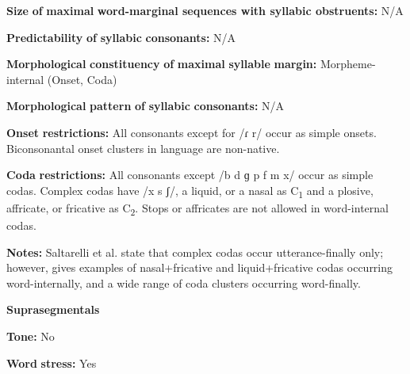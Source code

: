 \begin{styleBody}
\textbf{Size} \textbf{of} \textbf{maximal} \textbf{word{}-marginal sequences with syllabic obstruents:} N/A
\end{styleBody}

\begin{styleBody}
\textbf{Predictability} \textbf{of} \textbf{syllabic} \textbf{consonants:} N/A
\end{styleBody}

\begin{styleBody}
\textbf{Morphological} \textbf{constituency} \textbf{of} \textbf{maximal} \textbf{syllable} \textbf{margin:} Morpheme-internal (Onset, Coda)
\end{styleBody}

\begin{styleBody}
\textbf{Morphological} \textbf{pattern} \textbf{of} \textbf{syllabic} \textbf{consonants:} N/A
\end{styleBody}

\begin{styleBody}
\textbf{Onset} \textbf{restrictions:} All consonants except for /ɾ r/ occur as simple onsets. Biconsonantal onset clusters in language are non-native.
\end{styleBody}

\begin{styleBody}
\textbf{Coda} \textbf{restrictions:} All consonants except /b d ɡ p f m x/ occur as simple codas. Complex codas have /x s ʃ/, a liquid, or a nasal as C\textsubscript{1} and a plosive, affricate, or fricative as C\textsubscript{2}. Stops or affricates are not allowed in word-internal codas.
\end{styleBody}

\begin{styleBody}
\textbf{Notes:} Saltarelli et al. state that complex codas occur utterance-finally only; however, \citet{Hualde2003} gives examples of nasal+fricative and liquid+fricative codas occurring word-internally, and a wide range of coda clusters occurring word-finally.
\end{styleBody}

\begin{styleBody}
\textbf{Suprasegmentals}
\end{styleBody}

\begin{styleBody}
\textbf{Tone:} No
\end{styleBody}

\begin{styleBody}
\textbf{Word} \textbf{stress:} Yes
\end{styleBody}

